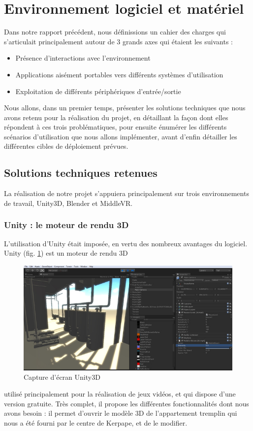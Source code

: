 \section{Environnement logiciel et matériel}

Dans notre rapport précédent, nous définissions un cahier des charges qui s'articulait principalement autour de 3 grands axes qui étaient les suivants : 
\begin{itemize}
\item Présence d'interactions avec l'environnement
\item Applications aisément portables vers différents systèmes d'utilisation
\item Exploitation de différents périphériques d'entrée/sortie
\end{itemize}
Nous allons, dans un premier temps, présenter les solutions techniques que nous avons retenu pour la réalisation du projet, en détaillant la façon dont elles répondent à ces trois problématiques, pour ensuite énumérer les différents scénarios d'utilisation que nous allons implémenter, avant d'enfin détailler les différentes cibles de déploiement prévues. 

\subsection{Solutions techniques retenues}
La réalisation de notre projet s'appuiera principalement sur trois environnements de travail, Unity3D, Blender et MiddleVR.

\subsubsection{Unity : le moteur de rendu 3D}
L'utilisation d'Unity était imposée, en vertu des nombreux avantages du logiciel. Unity (fig. \ref{screen_unity}) est un moteur de rendu 3D
\begin{figure}
	\centering
	\includegraphics[scale=0.5]{2-Specifications/img-utilisateur/screen_unity.jpg}
	\caption{Capture d'écran Unity3D}
	\label{screen_unity}
\end{figure}
utilisé principalement pour la réalisation de jeux vidéos, et qui dispose d'une version gratuite. Très complet, il propose les différentes fonctionnalités dont nous avons besoin : il permet d'ouvrir le modèle 3D de l'appartement tremplin qui nous a été fourni par le centre de Kerpape, et de le modifier.

